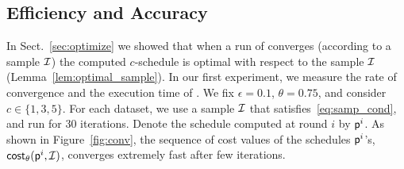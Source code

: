 


\subsection{Efficiency and Accuracy}
In Sect.~\ref{sec:optimize} we showed that when a run of \algonameapx converges
(according to a sample $\mathcal{I}$) the computed $c$-schedule is optimal with
respect to the sample $\mathcal{I}$ (Lemma~\ref{lem:optimal_sample}). In our first
experiment, we measure the rate of convergence and the execution time of
\algonameapx. We fix $\epsilon=0.1$, $\theta=0.75$, and consider
$c\in\{1,3,5\}$. For each dataset, we use a sample $\mathcal{I}$ that satisfies~\eqref{eq:samp_cond}, and run \algonameapx
for 30 iterations. Denote the schedule computed at round $i$ by $\mathsf{p}^i$.
As shown in Figure~\ref{fig:conv}, the sequence of cost values of the schedules
$\mathsf{p}^i$'s, $\mathsf{cost}_\theta(\mathsf{p}^i,\mathcal{I})$, converges extremely fast after few iterations.


